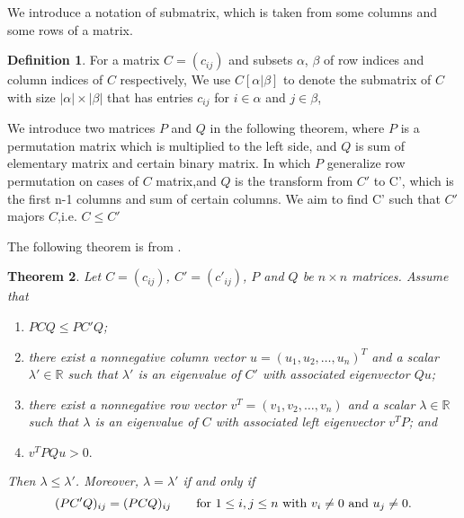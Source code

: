 \documentclass{article}
\theoremstyle{plain}
\newtheorem{thm}{Theorem}[section]
\theoremstyle{definition}
\newtheorem{defn}[thm]{Definition}
\begin{document}
    We introduce a notation of submatrix, which is taken from some columns and some rows of a
     matrix.

\begin{defn}
    For a matrix $C=(c_{ij})$ and subsets $\alpha$, $\beta$ of row indices and column 
    indices of $C$ respectively,  We use $C[\alpha|\beta]$ to denote the 
    submatrix of $C$ with size $ |\alpha| \times |\beta| $ that has entries $c_{ij}$ for $i\in \alpha$
    and $j\in\beta$,
\end{defn}


We introduce two matrices $P$ and $Q$ in the following theorem, where $P$ is a permutation
 matrix which is multiplied to the left side, and $Q$ is sum of elementary matrix and
 certain binary matrix. In which $P$ generalize row permutation on cases of $C$
 matrix,and $Q$ is the transform from $C'$ to C', which is the first n-1 columns
  and sum of certain columns. We aim to find C' such that $C'$ majors $C$,i.e. $C\leq C'$
 
The following theorem is from \cite{chang}.

\begin{thm}\label{pre_thm}
    Let $C=(c_{ij})$, $C'=(c'_{ij})$, $P$ and $Q$ be  $n\times n$ matrices.
Assume that
\begin{enumerate}[label=(\roman*)]
    \item \label{pre_thm_em1}  $PCQ\leq PC'Q$;
    \item \label{pre_thm_em2} there exist a nonnegative column vector $u=(u_1, u_2, \ldots, u_n)^T$  and a
    scalar $\lambda'\in \mathbb{R}$ such that $\lambda'$ is an eigenvalue of $C'$ with
    associated eigenvector $Qu$;
    \item \label{pre_thm_em3}  there exist a nonnegative row vector $v^T=(v_1, v_2, \ldots, v_n)$  and a scalar
    $\lambda\in \mathbb{R}$such that $\lambda$ is an eigenvalue of $C$ with associated  left
    eigenvector $v^TP$; and
    \item \label{pre_thm_em4} $v^TPQu>0.$
\end{enumerate}
    Then $\lambda\leq \lambda'$. Moreover, $\lambda=\lambda'$ if and only if
    \begin{equation}\label{pre0}
        (PC'Q)_{ij}=(PCQ)_{ij}\qquad \hbox{for~}1\leq i, j\leq n \hbox{~with~} v_i\ne 0 \hbox{~and~} u_j\ne 0.
    \end{equation}
\end{thm}
\end{document}
